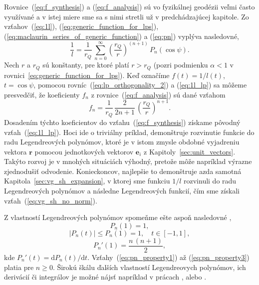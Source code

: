 \documentclass[a4paper, 12pt]{book}
\newcommand{\diff}{\mathrm d}
\let\vec\mathbf
\begin{document}
Rovnice~(\ref{eq:f_synthesis}) a (\ref{eq:f_analysis}) sú vo fyzikálnej 
geodézii veľmi často využívané a  v istej miere sme sa s nimi stretli už 
v predchádzajúcej kapitole.  Zo vzťahov~(\ref{eq:1l}), 
(\ref{eq:generic_function_for_lps}), 
(\ref{eq:maclaurin_series_of_generic_function}) a (\ref{eq:pn}) vyplýva 
nasledovné,
%
\begin{equation}
\label{eq:1l_lp}
\frac{1}{l} = \frac{1}{r_Q} \, \sum_{n = 0}^\infty \left( \frac{r_Q}{r} 
\right)^{(n + 1)} \, P_n(\cos\psi){.}
\end{equation}
%
Nech $r$ a $r_Q$ sú konštanty, pre ktoré platí $r > r_Q$ (pozri podmienku 
$\alpha < 1$ v rovnici~\ref{eq:generic_function_for_lps}).  Keď označíme $f(t) 
= 1 \slash l(t)$, $t = \cos\psi$, pomocou rovníc~(\ref{eq:lp_orthogonality_2}) 
a (\ref{eq:1l_lp}) sa môžeme presvedčiť, že koeficienty $f_n$ 
z rovnice~(\ref{eq:f_analysis}) sú dané vzťahom
%
\begin{equation}
f_n = \frac{1}{r_Q} \, \frac{2}{2n + 1} \, \left( \frac{r_Q}{r} \right)^{n 
+ 1}{.}
\end{equation}
%
Dosadením týchto koeficientov do vzťahu~(\ref{eq:f_synthesis}) získame pôvodný 
vzťah~(\ref{eq:1l_lp}).  Hoci ide o triviálny príklad, demonštruje rozvinutie 
funkcie do radu Legendreových polynómov, ktoré je v istom zmysle obdobné 
vyjadreniu vektora $\vec r$ pomocou jednotkových vektorov $\vec e_i$ 
z Kapitoly~\ref{sec:unit_vectors}.  Takýto rozvoj je v mnohých situáciách 
výhodný, pretože môže napríklad výrazne zjednodušiť odvodenie.  Konieckoncov, 
najlepšie to demonštruje azda samotná Kapitola~\ref{sec:vg_sh_expansion}, 
v ktorej sme funkciu $1 \slash l$ rozvinuli do radu Legendreových polynómov 
a následne Legendreových funkcií, čím sme získali 
vzťah~(\ref{eq:vg_sh_no_norm}).

Z vlastností Legendreových polynómov spomeňme ešte aspoň nasledovné
\citep{Freeden2009},
%
\begin{equation}
\label{eq:pn_property1}
P_n(1) = 1{,}
\end{equation}
%
\begin{equation}
\label{eq:pn_property2}
|P_n(t)| \leq P_n(1) = 1{,} \quad t \in [-1, 1]{,}
\end{equation}
%
\begin{equation}
\label{eq:pn_property3}
P_n'(1) = \frac{n \, (n + 1)}{2}{,}
\end{equation}
%
kde $P_n'(t) = \diff P_n(t) \slash \diff t$.  Vzťahy~(\ref{eq:pn_property1}) až 
(\ref{eq:pn_property3}) platia pre $n \geq 0$.   Širokú škálu ďalších 
vlastností Legendreovych polynómov, ich derivácií či integrálov je možné nájsť 
napríklad v prácach \cite{Gradshteyn2007}, \cite{Freeden2009} alebo 
\cite{Olver2010}.
\end{document}
